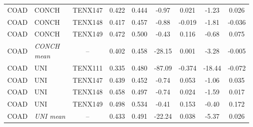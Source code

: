 \begin{table}[t]
{\begin{tabular}{llccccccc}
COAD & CONCH & TENX147 & 0.422 & 0.444 & -0.97 & 0.021 & -1.23 & 0.026 \\
COAD & CONCH & TENX148 & 0.417 & 0.457 & -0.88 & -0.019 & -1.81 & -0.036 \\
COAD & CONCH & TENX149 & 0.472 & 0.500 & -0.43 & 0.116 & -0.68 & 0.075 \\
COAD & \textit{CONCH mean} & -- & 0.402 & 0.458 & -28.15 & 0.001 & -3.28 & -0.005 \\
COAD & UNI & TENX111 & 0.335 & 0.480 & -87.09 & -0.374 & -18.44 & -0.072 \\
COAD & UNI & TENX147 & 0.439 & 0.452 & -0.74 & 0.053 & -1.06 & 0.035 \\
COAD & UNI & TENX148 & 0.458 & 0.497 & -0.74 & 0.024 & -1.59 & 0.017 \\
COAD & UNI & TENX149 & 0.498 & 0.534 & -0.41 & 0.153 & -0.40 & 0.172 \\
COAD & \textit{UNI mean} & -- & 0.433 & 0.491 & -22.24 & 0.038 & -5.37 & 0.026 \\
\bottomrule
\end{tabular}%
}
\end{table}
